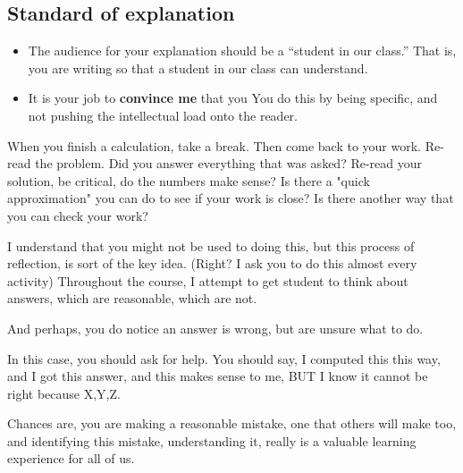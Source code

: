 \documentclass[handout,numbers,nooutcomes,hints]{../ximera}
\begin{document}
\subsection*{Standard of explanation}
\begin{itemize}
  \item The audience for your explanation should be a ``student in our
    class.'' That is, you are writing so that a student in our class
    can understand. 
  \item It is your job to \textbf{convince me} that you  You do this by being specific, and not pushing the
    intellectual load onto the reader.
\end{itemize}


When you finish a calculation, take a break. Then come back to your
work.  Re-read the problem. Did you answer everything that was asked?
Re-read your solution, be critical, do the numbers make sense? Is
there a "quick approximation" you can do to see if your work is close?
Is there another way that you can check your work?

I understand that you might not be used to doing this, but this
process of reflection, is sort of the key idea. (Right? I ask you to
do this almost every activity) Throughout the course, I attempt to get
student to think about answers, which are reasonable, which are not.

And perhaps, you do notice an answer is wrong, but are unsure what to
do.

In this case, you should ask for help. You should say, I computed this
this way, and I got this answer, and this makes sense to me, BUT I
know it cannot be right because X,Y,Z.

Chances are, you are making a reasonable mistake, one that others will
make too, and identifying this mistake, understanding it, really is a
valuable learning experience for all of us.




\end{document}
